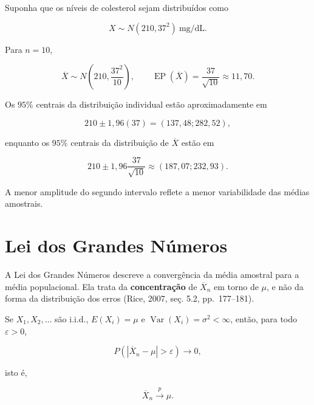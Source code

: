 \documentclass[
  letterpaper,
  DIV=11,
  numbers=noendperiod]{scrreprt}
\begin{document}
\begin{tcolorbox}[enhanced jigsaw, colback=white, leftrule=.75mm, colbacktitle=quarto-callout-tip-color!10!white, breakable, titlerule=0mm, bottomtitle=1mm, title=\textcolor{quarto-callout-tip-color}{\faLightbulb}\hspace{0.5em}{Exemplo --- Níveis de colesterol}, colframe=quarto-callout-tip-color-frame, toprule=.15mm, opacityback=0, bottomrule=.15mm, opacitybacktitle=0.6, arc=.35mm, toptitle=1mm, rightrule=.15mm, coltitle=black, left=2mm]

Suponha que os níveis de colesterol sejam distribuídos como

\[X\sim N(210,37^2)\ \text{mg/dL}.\]

Para \(n=10\),

\[\overline{X}\sim N\left(210,\frac{37^2}{10}\right),
\qquad
\operatorname{EP}(\overline{X})=\frac{37}{\sqrt{10}}\approx 11{,}70.\]

Os \(95\%\) centrais da distribuição individual estão aproximadamente em

\[210\pm1{,}96(37)=(137{,}48;282{,}52),\]

enquanto os \(95\%\) centrais da distribuição de \(\overline{X}\) estão
em

\[210\pm1{,}96\frac{37}{\sqrt{10}}
\approx
(187{,}07;232{,}93).\]

A menor amplitude do segundo intervalo reflete a menor variabilidade das
médias amostrais.

\end{tcolorbox}

\section{Lei dos Grandes Números}\label{lei-dos-grandes-nuxfameros}

A Lei dos Grandes Números descreve a convergência da média amostral para
a média populacional. Ela trata da \textbf{concentração} de
\(\overline{X}_n\) em torno de \(\mu\), e não da forma da distribuição
dos erros (Rice, 2007, seç. 5.2, pp.~177--181).

\begin{tcolorbox}[enhanced jigsaw, colback=white, leftrule=.75mm, colbacktitle=quarto-callout-important-color!10!white, breakable, titlerule=0mm, bottomtitle=1mm, title=\textcolor{quarto-callout-important-color}{\faExclamation}\hspace{0.5em}{Teorema --- Lei Fraca dos Grandes Números}, colframe=quarto-callout-important-color-frame, toprule=.15mm, opacityback=0, bottomrule=.15mm, opacitybacktitle=0.6, arc=.35mm, toptitle=1mm, rightrule=.15mm, coltitle=black, left=2mm]

Se \(X_1,X_2,\ldots\) são i.i.d., \(E(X_i)=\mu\) e
\(\operatorname{Var}(X_i)=\sigma^2<\infty\), então, para todo
\(\varepsilon>0\),

\[P\left(|\overline{X}_n-\mu|>\varepsilon\right)
\longrightarrow 0,\]

isto é,

\[\overline{X}_n\xrightarrow{p}\mu.\]

\end{tcolorbox}
\end{document}

